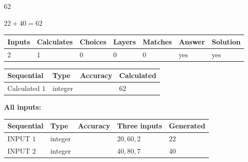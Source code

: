 \documentclass[12pt]{article}
\begin{document}
\noindent{}
 
 

62
 
 
\noindent{}
 
 

 
 
 
\noindent{}
 
 

$ %
22 +  %
40=   %
62$
 
 
\noindent{}
 
 

 
   
   
   
   
\noindent\begin{tabular}{|l|l|l|l|l|l|l|}
 \hline
Inputs & Calculates & Choices & Layers & Matches & Answer & Solution \\ \hline
 2  & 
 1  & 
 0
  & 
 0  & 
 0  & 
  yes & 
  yes 
  \\ \hline
 \end{tabular}
   
   
   
   
\noindent{}
   
   
  
  
\noindent\begin{tabular}{|l|l|l|l|}
\hline
 Sequential & Type & Accuracy & Calculated \\ 
\hline
 
 
  Calculated $  1 $ & integer &  & 
  $ 62 $ 
 \\  \hline  
 \end{tabular}
   
   
   
   
\noindent\vspace{0.1in}\hspace{-0.08in} {\textbf{\Large{All inputs: }}}
   
   
  
  
\noindent\begin{tabular}{|l|l|l|l|l|}
\hline
 Sequential & Type & Accuracy & Three inputs & Generated \\ 
\hline
 
 
  INPUT $  1 $ & integer &  & $
 20
 , 
 60
 , 
 2
 $ & $ 22 $ 
 \\  \hline  
 
 
  INPUT $  2 $ & integer &  & $
 40
 , 
 80
 , 
 7
 $ & $ 40 $ 
 \\  \hline  
 \end{tabular}
   
\end{document}
